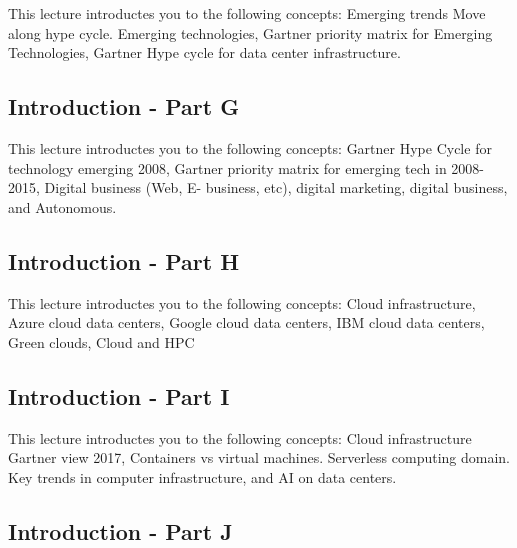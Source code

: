 This lecture introductes you to the following concepts: Emerging
trends Move along hype cycle. Emerging technologies, Gartner priority
matrix for Emerging Technologies, Gartner Hype cycle for data center
infrastructure.

\subsection{Introduction - Part G}\label{s:cloud-fundamentals-g}

This lecture introductes you to the following concepts: Gartner Hype
Cycle for technology emerging 2008, Gartner priority matrix for
emerging tech in 2008-2015, Digital business (Web, E- business, etc),
digital marketing, digital business, and Autonomous.

\subsection{Introduction - Part H}\label{s:cloud-fundamentals-h}


This lecture introductes you to the following concepts: Cloud
infrastructure, Azure cloud data centers, Google cloud data centers,
IBM cloud data centers, Green clouds, Cloud and HPC

\subsection{Introduction - Part I}\label{s:cloud-fundamentals-i}

This lecture introductes you to the following concepts: Cloud
infrastructure Gartner view 2017, Containers vs virtual
machines. Serverless computing domain. Key trends in computer
infrastructure, and AI on data centers.

\subsection{Introduction - Part J}\label{s:cloud-fundamentals-j}

